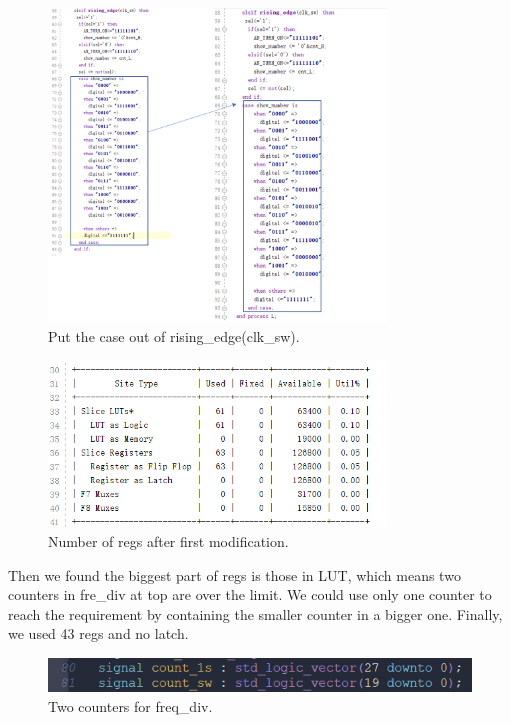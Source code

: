 \documentclass[a4paper]{article}
\begin{document}
\begin{figure}[h]
\centering
\includegraphics[width=0.8\textwidth]{3.png}
\caption{\label{fig:data}Put the case out of rising\_edge(clk\_sw).}
\end{figure}


\newpage

\begin{figure}[t]
\centering
\includegraphics[width=0.8\textwidth]{4.png}
\caption{\label{fig:data}Number of regs after first modification.}
\end{figure}

\newpage

Then we found the biggest part of regs is those in LUT, which means two counters in fre\_div at top are over the limit. We could use only one counter to reach the requirement by containing the smaller counter in a bigger one. Finally, we used 43 regs and no latch.


\begin{figure}[h]
\centering
\includegraphics[width=1\textwidth]{5.png}
\caption{\label{fig:data}Two counters for freq\_div.}
\end{figure}
\end{document}
